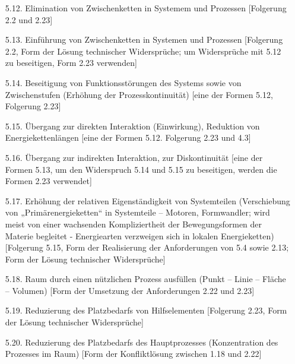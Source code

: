 \documentclass[11pt,a4paper]{article}
\begin{document}
\begin{itemize}
  \begin{itemize}
  \item zur Überwindung natürlicher Grenzen 
  \item zur Beseitigung ökologischer schädlicher Effekte
  \item zur Steigerung der Effizienz des Systems bei der Nutzung von Abfällen
    (insbesondere wenn die natürlichen Ressourcen erschöpft sind)
  \end{itemize}
[eine der Folgerungen 5.8 und 2.21, Folgerung 2.23. Form der Konfliktlösung
  zwischen 1.18 und 2.22, Form der Lösung technischer Widersprüche]
\item[5.12.] Elimination von Zwischenketten in Systemem und Prozessen
  [Folgerung 2.2 und 2.23]
\item[5.13.] Einführung von Zwischenketten in Systemen und Prozessen
  [Folgerung 2.2, Form der Lösung technischer Widersprüche; um Widersprüche
    mit 5.12 zu beseitigen, Form 2.23 verwenden]
\item[5.14.] Beseitigung von Funktionsstörungen des Systems sowie von
  Zwischenstufen (Erhöhung der Prozesskontinuität) [eine der Formen 5.12,
    Folgerung 2.23]
\item[5.15.] Übergang zur direkten Interaktion (Einwirkung), Reduktion von
  Energiekettenlängen [eine der Formen 5.12. Folgerung 2.23 und 4.3]
\item[5.16.] Übergang zur indirekten Interaktion, zur Diskontinuität [eine der
  Formen 5.13, um den Widerspruch 5.14 und 5.15 zu beseitigen, werden die
  Formen 2.23 verwendet]
\item[5.17.] Erhöhung der relativen Eigenständigkeit von Systemteilen
  (Verschiebung von „Primärenergieketten“ in Systemteile -- Motoren,
  Formwandler; wird meist von einer wachsenden Kompliziertheit der
  Bewegungsformen der Materie begleitet - Energiearten verzweigen sich in
  lokalen Energieketten) [Folgerung 5.15, Form der Realisierung der
    Anforderungen von 5.4 sowie 2.13; Form der Lösung technischer
    Widersprüche]
\item[5.18.] Raum durch einen nützlichen Prozess ausfüllen (Punkt -- Linie --
  Fläche -- Volumen) [Form der Umsetzung der Anforderungen 2.22 und 2.23]
\item[5.19.] Reduzierung des Platzbedarfs von Hilfselementen [Folgerung 2.23,
  Form der Lösung technischer Widersprüche]
\item[5.20.] Reduzierung des Platzbedarfs des Hauptprozesses (Konzentration
  des Prozesses im Raum) [Form der Konfliktlösung zwischen 1.18 und 2.22]
\end{itemize}
\end{document}

